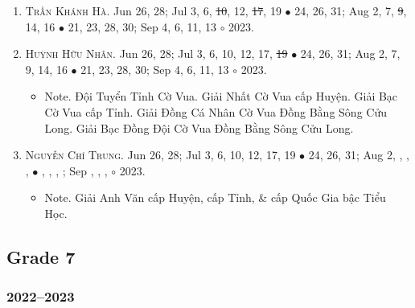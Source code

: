 \documentclass{article}
\begin{document}
\begin{enumerate}
	\item \textsc{Trần Khánh Hà.} {\sf[In]} Jun 26, 28; Jul 3, 6, \st{10}, 12, \st{17}, 19 $\bullet$ 24, 26, 31; Aug 2, 7, \st{9}, 14, 16 $\bullet$ 21, 23, 28, 30; Sep 4, 6, 11, 13 $\circ$ 2023.
	\item \textsc{Huỳnh Hữu Nhân.} {\sf[In]} Jun 26, 28; Jul 3, 6, 10, 12, 17, \st{19} $\bullet$ 24, 26, 31; Aug 2, 7, 9, 14, 16 $\bullet$ 21, 23, 28, 30; Sep 4, 6, 11, 13 $\circ$ 2023.
	\begin{itemize}
		\item {\sf Note.} Đội Tuyển Tỉnh Cờ Vua. Giải Nhất Cờ Vua cấp Huyện. Giải Bạc Cờ Vua cấp Tỉnh. Giải Đồng Cá Nhân Cờ Vua Đồng Bằng Sông Cửu Long. Giải Bạc Đồng Đội Cờ Vua Đồng Bằng Sông Cửu Long.
	\end{itemize}
	\item \textsc{Nguyễn Chí Trung.} {\sf[In]} Jun 26, 28; Jul 3, 6, 10, 12, 17, 19 $\bullet$ 24, 26, 31; Aug 2, , , ,  $\bullet$ , , , ; Sep , , ,  $\circ$ 2023.
	\begin{itemize}
		\item {\sf Note.} Giải Anh Văn cấp Huyện, cấp Tỉnh, \& cấp Quốc Gia bậc Tiểu Học.
	\end{itemize}
\end{enumerate}


\subsection{Grade 7}

\subsubsection{2022--2023}
\end{document}
